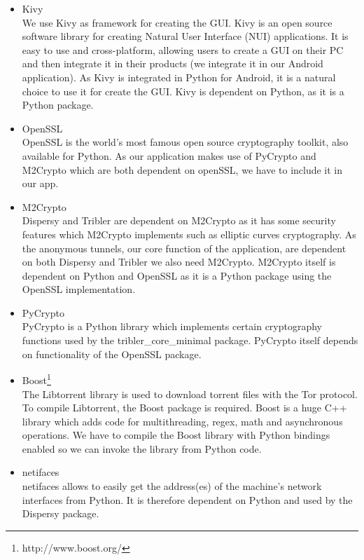 		\begin{itemize}
		
			\item Kivy\\
			We use Kivy as framework for creating the GUI. Kivy is an open source software library for creating Natural User Interface (NUI) applications. It is easy to use and cross-platform, allowing users to create a GUI on their PC and then integrate it in their products (we integrate it in our Android application). As Kivy is integrated in Python for Android, it is a natural choice to use it for create the GUI. Kivy is dependent on Python, as it is a Python package. 
		
			\item OpenSSL\\
			OpenSSL is the world's most famous open source cryptography toolkit, also available for Python. As our application makes use of PyCrypto and M2Crypto which are both dependent on openSSL, we have to include it in our app.
		
			\item M2Crypto\\
			Dispersy and Tribler are dependent on M2Crypto as it has some security features which M2Crypto implements such as elliptic curves cryptography. As the anonymous tunnels, our core function of the application, are dependent on both Dispersy and Tribler we also need M2Crypto. M2Crypto itself is dependent on Python and OpenSSL as it is a Python package using the OpenSSL implementation.
		
			\item PyCrypto\\
			PyCrypto is a Python library which implements certain cryptography functions used by the tribler\_core\_minimal package. PyCrypto itself depends on functionality of the OpenSSL package.
		
			\item Boost\footnote{http://www.boost.org/}\\
			The Libtorrent library is used to download torrent files with the Tor protocol. To compile Libtorrent, the Boost package is required. Boost is a huge C++ library which adds code for multithreading, regex, math and asynchronous operations. We have to compile the Boost library with Python bindings enabled so we can invoke the library from Python code.
		
			\item netifaces\\
			netifaces allows to easily get the address(es) of the machine's network interfaces from Python. It is therefore dependent on Python and used by the Dispersy package.
		

\end{itemize}
